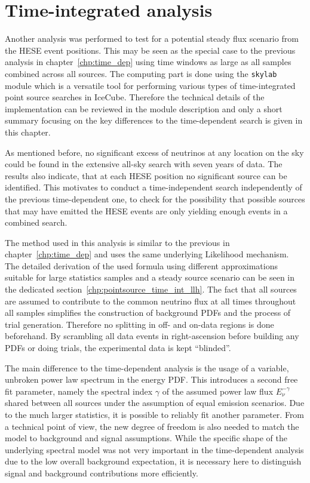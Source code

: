 \chapter{Time-integrated analysis}
  \label{chp:time_indep}
Another analysis was performed to test for a potential steady flux scenario from the HESE event positions.
This may be seen as the special case to the previous analysis in chapter~\ref{chp:time_dep} using time windows as large as all samples combined across all sources.
The computing part is done using the \lstinline!skylab! \cite{Aartsen:2016oji,skylabrepo} module which is a versatile tool for performing various types of time-integrated point source searches in IceCube.
Therefore the technical details of the implementation can be reviewed in the module description and only a short summary focusing on the key differences to the time-dependent search is given in this chapter.

As mentioned before, no significant excess of neutrinos at any location on the sky could be found in the extensive all-sky search with seven years of data.
The results also indicate, that at each HESE position no significant source can be identified.
This motivates to conduct a time-independent search independently of the previous time-dependent one, to check for the possibility that possible sources that may have emitted the HESE events are only yielding enough events in a combined search.

The method used in this analysis is similar to the previous in chapter~\ref{chp:time_dep} and uses the same underlying Likelihood mechanism.
The detailed derivation of the used formula using different approximations suitable for large statistics samples and a steady source scenario can be seen in the dedicated section~\ref{chp:pointsource_time_int_llh}.
The fact that all sources are assumed to contribute to the common neutrino flux at all times throughout all samples simplifies the construction of background PDFs and the process of trial generation.
Therefore no splitting in off- and on-data regions is done beforehand.
By scrambling all data events in right-ascension before building any PDFs or doing trials, the experimental data is kept \enquote{blinded}.

The main difference to the time-dependent analysis is the usage of a variable, unbroken power law spectrum in the energy PDF.
This introduces a second free fit parameter, namely the spectral index $\gamma$ of the assumed power law flux $E_\nu^{-\gamma}$ shared between all sources under the assumption of equal emission scenarios.
Due to the much larger statistics, it is possible to reliably fit another parameter.
From a technical point of view, the new degree of freedom is also needed to match the model to background and signal assumptions.
While the specific shape of the underlying spectral model was not very important in the time-dependent analysis due to the low overall background expectation, it is necessary here to distinguish signal and background contributions more efficiently.


